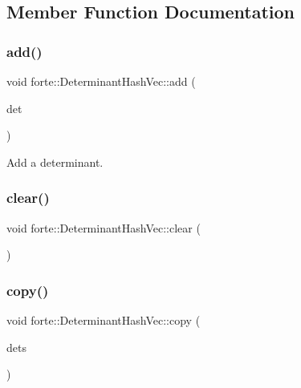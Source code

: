 \subsection{Member Function Documentation}
\mbox{\label{classforte_1_1_determinant_hash_vec_a704d0c4af99bc018e01e96ca8ae8c9db}} 
\subsubsection{\texorpdfstring{add()}{add()}}
{\footnotesize\ttfamily void forte\+::\+Determinant\+Hash\+Vec\+::add (\begin{DoxyParamCaption}\item[{const \mbox{\hyperlink{namespaceforte_a2076c63fd7b8732004d9e1442ce527c1}{Determinant}} \&}]{det }\end{DoxyParamCaption})}



Add a determinant. 

\mbox{\label{classforte_1_1_determinant_hash_vec_a0a2110402a7e015c08edae95479cf0b9}} 
\subsubsection{\texorpdfstring{clear()}{clear()}}
{\footnotesize\ttfamily void forte\+::\+Determinant\+Hash\+Vec\+::clear (\begin{DoxyParamCaption}{ }\end{DoxyParamCaption})}

\mbox{\label{classforte_1_1_determinant_hash_vec_a1c25ea4516f605640e8c7e134b13aecd}} 
\subsubsection{\texorpdfstring{copy()}{copy()}}
{\footnotesize\ttfamily void forte\+::\+Determinant\+Hash\+Vec\+::copy (\begin{DoxyParamCaption}\item[{\mbox{\hyperlink{classforte_1_1_determinant_hash_vec}{Determinant\+Hash\+Vec}} \&}]{dets }\end{DoxyParamCaption})}

